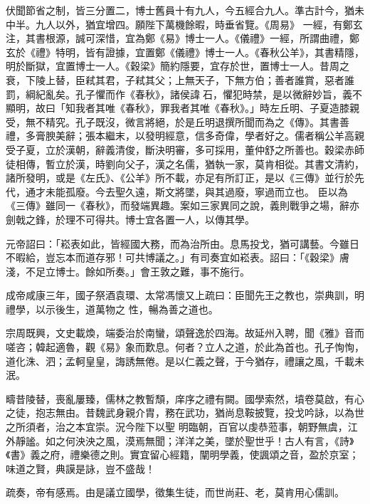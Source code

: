 \begin{pinyinscope}
 伏聞節省之制，皆三分置二，博士舊員十有九人，今五經合九人。準古計今，猶未中半。九人以外，猶宜增四。願陛下萬機餘暇，時垂省覽。《周易》
 一經，有鄭玄注，其書根源，誠可深惜，宜為鄭《易》博士一人。《儀禮》一經，所謂曲禮，鄭玄於《禮》特明，皆有證據，宜置鄭《儀禮》博士一人。《春秋公羊》，其書精隱，明於斷獄，宜置博士一人。《穀梁》簡約隱要，宜存於世，置博士一人。昔周之衰，下陵上替，臣弒其君，子弒其父；上無天子，下無方伯；善者誰賞，惡者誰罰，綱紀亂矣。孔子懼而作《春秋》，諸侯諱石，懼犯時禁，是以微辭妙旨，義不顯明，故曰「知我者其唯《春秋》，罪我者其唯《春秋》。」時左丘明、子夏造膝親
 受，無不精究。孔子既沒，微言將絕，於是丘明退撰所聞而為之《傳》。其書善禮，多膏腴美辭；張本繼末，以發明經意，信多奇偉，學者好之。儒者稱公羊高親受子夏，立於漢朝，辭義清俊，斷決明審，多可採用，董仲舒之所善也。穀梁赤師徒相傳，暫立於漢，時劉向父子，漢之名儒，猶執一家，莫肯相從。其書文清約，諸所發明，或是《左氏》、《公羊》所不載，亦足有所訂正，是以《三傳》並行於先代，通才未能孤廢。今去聖久遠，斯文將墜，與其過廢，寧過而立也。
 臣以為《三傳》雖同一《春秋》，而發端異趣。案如三家異同之說，義則戰爭之場，辭亦劍戟之鋒，於理不可得共。博士宜各置一人，以傳其學。



 元帝詔曰：「崧表如此，皆經國大務，而為治所由。息馬投戈，猶可講藝。今雖日不暇給，豈忘本而道存邪！可共博議之。」有司奏宜如崧表。詔曰：「《穀梁》膚淺，不足立博士。餘如所奏。」會王敦之難，事不施行。



 成帝咸康三年，國子祭酒袁環、太常馮懷又上疏曰：臣聞先王之教也，崇典訓，明禮學，以示後生，道萬物之
 性，暢為善之道也。



 宗周既興，文史載煥，端委治於南蠻，頌聲逸於四海。故延州入聘，聞《雅》音而嗟咨；韓起適魯，觀《易》象而歎息。何者？立人之道，於此為首也。孔子恂恂，道化洙、泗；孟軻皇皇，誨誘無倦。是以仁義之聲，于今猶存，禮讓之風，千載未泯。



 疇昔陵替，喪亂屢臻，儒林之教暫頹，庠序之禮有闕。國學索然，墳卷莫啟，有心之徒，抱志無由。昔魏武身親介胄，務在武功，猶尚息鞍披覽，投戈吟詠，以為世之所須者，治之本宜崇。況今陛下以聖
 明臨朝，百官以虔恭蒞事，朝野無虞，江外靜謐。如之何泱泱之風，漠焉無聞；洋洋之美，墜於聖世乎！古人有言，《詩》《書》義之府，禮樂德之則。實宜留心經籍，闡明學義，使諷頌之音，盈於京室；味道之賢，典謨是詠，豈不盛哉！



 疏奏，帝有感焉。由是議立國學，徵集生徒，而世尚莊、老，莫肯用心儒訓。




\end{pinyinscope}
